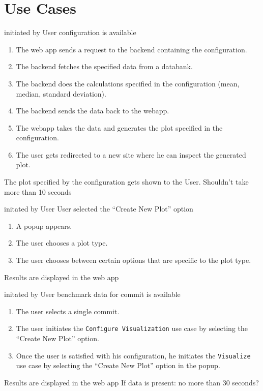 \section{Use Cases}

{initiated by User}
{\gls{configuration} is available}
{\begin{enumerate}
    \item The web app sends a request to the backend containing the \gls{configuration}.
    \item The backend fetches the specified data from a databank.
    \item The backend does the calculations specified in the \gls{configuration} (mean, median, standard deviation).
    \item The backend sends the data back to the webapp.
    \item The webapp takes the data and generates the plot specified in the \gls{configuration}.
    \item The user gets redirected to a new site where he can inspect the generated plot.
\end{enumerate}}
{The plot specified by the \gls{configuration} gets shown to the User.}
{Shouldn't take more than 10 seconds}

\bigskip

{initated by User}
{User selected the \enquote{Create New Plot} option}
{\begin{enumerate}
    \item A popup appears.
    \item The user chooses a plot type.
    \item The user chooses between certain options that are specific to the plot type.
\end{enumerate}}
{Results are displayed in the web app}
{}

\bigskip

{initated by User}
{benchmark data for commit is available}
{\begin{enumerate}
    \item The user selects a single commit.
    \item The user initiates the \texttt{Configure Visualization} use case by selecting the \enquote{Create New Plot} option.
    \item Once the user is satisfied with his \gls{configuration}, he initiates the \texttt{Visualize} use case by selecting the \enquote{Create New Plot} option in the popup.
\end{enumerate}}
{Results are displayed in the web app}
{If data is present: no more than 30 seconds?}

